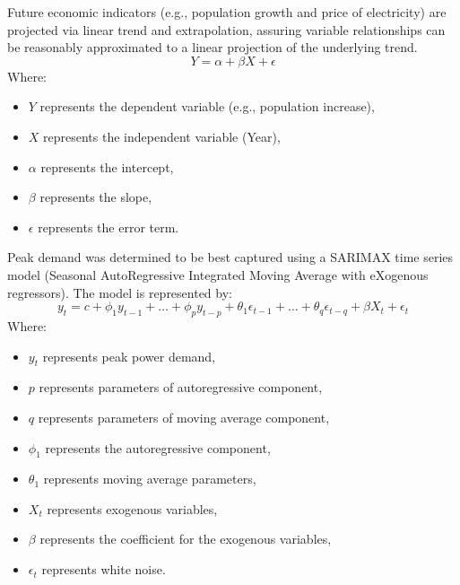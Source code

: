 \documentclass[12pt]{article}
\begin{document}
Future economic indicators (e.g., population growth and price of electricity) are projected via linear trend and extrapolation, assuring variable relationships can be reasonably approximated to a linear projection of the underlying trend.
\[
Y = \alpha + \beta X + \epsilon
\]
Where:
\begin{itemize}
    \item $Y$ represents the dependent variable (e.g., population increase),
    \item $X$ represents the independent variable (Year),
    \item $\alpha$ represents the intercept,
    \item $\beta$ represents the slope,
    \item $\epsilon$ represents the error term.
\end{itemize}

Peak demand was determined to be best captured using a SARIMAX time series model (Seasonal AutoRegressive Integrated Moving Average with eXogenous regressors). The model is represented by:
\[
y_t = c + \phi_1 y_{t-1} + \dots + \phi_p y_{t-p} + \theta_1 \epsilon_{t-1} + \dots + \theta_q \epsilon_{t-q} + \beta X_t + \epsilon_t
\]
Where:
\begin{itemize}
    \item $y_t$ represents peak power demand,
    \item $p$ represents parameters of autoregressive component,
    \item $q$ represents parameters of moving average component,
    \item $\phi_1$ represents the autoregressive component,
    \item $\theta_1$ represents moving average parameters,
    \item $X_t$ represents exogenous variables,
    \item $\beta$ represents the coefficient for the exogenous variables,
    \item $\epsilon_t$ represents white noise.
\end{itemize}
\end{document}
